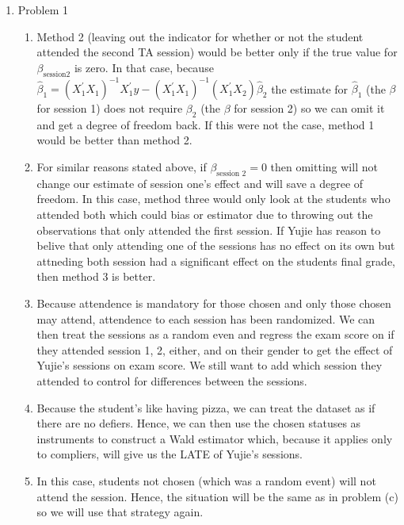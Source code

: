 \documentclass[11pt]{SelfArxOneColBMN}
\affiliation{\textsuperscript{1}\textit{John E. Walker Department of Economics,
Clemson University,Clemson, SC: email ijdavis@g.clemson.edu}}
\date{\small{Version ~\today}}
\begin{document}
\flushbottom

\maketitle

\begin{enumerate}
  \item Problem 1
  \begin{enumerate}
    \item Method 2 (leaving out the indicator for whether or not the student attended the second TA session) would be better only if the true value for $\beta_{\text{session2}}$ is zero. In that case, because $\hat{\beta}_1 = (X_1^\prime X_1)^{-1}X_1^\prime y - (X_1^\prime X_1)^{-1}(X_1^\prime X_2)\hat{\beta}_2$ the estimate for $\hat{\beta}_1$ (the $\beta$ for session 1) does not require $\beta_2$ (the $\beta$ for session 2) so we can omit it and get a degree of freedom back. If this were not the case, method 1 would be better than method 2.
    \item For similar reasons stated above, if $\beta_\text{{session 2}} = 0$ then omitting will not change our estimate of session one's effect and will save a degree of freedom. In this case, method three would only look at the students who attended both which could bias or estimator due to throwing out the observations that only attended the first session. If Yujie has reason to belive that only attending one of the sessions has no effect on its own but attneding both session had a significant effect on the students final grade, then method 3 is better.
    \item Because attendence is mandatory for those chosen and only those chosen may attend, attendence to each session has been randomized. We can then treat the sessions as a random even and regress the exam score on if they attended session 1, 2, either, and on their gender to get the effect of Yujie's sessions on exam score. We still want to add which session they attended to control for differences between the sessions.
    \item Because the student's like having pizza, we can treat the dataset as if there are no defiers. Hence, we can then use the chosen statuses as instruments to construct a Wald estimator which, because it applies only to compliers, will give us the LATE of Yujie's sessions.
    \item In this case, students not chosen (which was a random event) will not attend the session. Hence, the situation will be the same as in problem (c) so we will use that strategy again.

\end{enumerate}
\end{enumerate}
\end{document}
